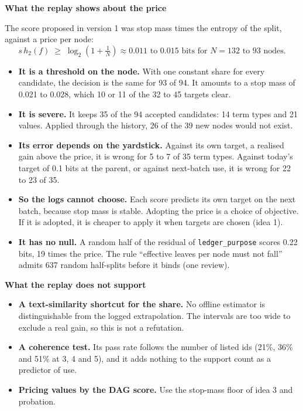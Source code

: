 \documentclass[10pt,a4paper]{article}
\newcommand{\code}[1]{\texttt{#1}}
\newcommand{\lab}[1]{\par\vspace{0.35em}\textbf{#1}\par\nobreak}
\begin{document}
\lab{What the replay shows about the price}
The score proposed in version 1 was stop mass times the entropy of the split, against a price per node:
\begin{equation}
s\,h_2(f) \;\ge\; \log_2\!\left(1 + \tfrac{1}{N}\right) \approx 0.011 \text{ to } 0.015 \text{ bits for } N = 132 \text{ to } 93 \text{ nodes.}
\end{equation}
\begin{itemize}
\item \textbf{It is a threshold on the node.} With one constant share for every candidate, the decision is the same for 93 of 94. It amounts to a stop mass of 0.021 to 0.028, which 10 or 11 of the 32 to 45 targets clear.
\item \textbf{It is severe.} It keeps 35 of the 94 accepted candidates: 14 term types and 21 values. Applied through the history, 26 of the 39 new nodes would not exist.
\item \textbf{Its error depends on the yardstick.} Against its own target, a realised gain above the price, it is wrong for 5 to 7 of 35 term types. Against today's target of 0.1 bits at the parent, or against next-batch use, it is wrong for 22 to 23 of 35.
\item \textbf{So the logs cannot choose.} Each score predicts its own target on the next batch, because stop mass is stable. Adopting the price is a choice of objective. If it is adopted, it is cheaper to apply it when targets are chosen (idea 1).
\item \textbf{It has no null.} A random half of the residual of \code{ledger\_purpose} scores 0.22 bits, 19 times the price. The rule ``effective leaves per node must not fall'' admits 637 random half-splits before it binds (one review).
\end{itemize}

\lab{What the replay does not support}
\begin{itemize}
\item \textbf{A text-similarity shortcut for the share.} No offline estimator is distinguishable from the logged extrapolation. The intervals are too wide to exclude a real gain, so this is not a refutation.
\item \textbf{A coherence test.} Its pass rate follows the number of listed ids (21\%, 36\% and 51\% at 3, 4 and 5), and it adds nothing to the support count as a predictor of use.
\item \textbf{Pricing values by the DAG score.} Use the stop-mass floor of idea 3 and probation.
\end{itemize}
\end{document}
